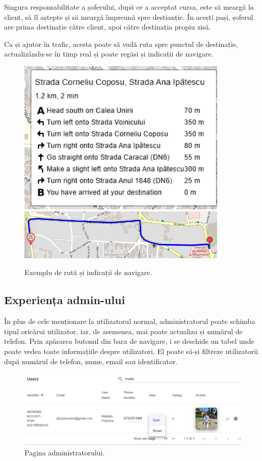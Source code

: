 Singura responsabilitate a șoferului, după ce a acceptat cursa, este să meargă la client, să îl aștepte și să
meargă împreună spre destianție. În acești pași, șoferul are prima destinație către client, apoi către destinația propiu zisă.

Ca și ajutor în trafic, acesta poate să vadă ruta spre punctul de destinație, actualizându-se în timp real și poate regăsi și
indicații de navigare.

\begin{figure}[H]
    \centering
    \includegraphics[width=10cm]{Assets/indicates.png}
    \includegraphics[width=10cm]{Assets/route.png}
    \caption{Exemplu de rută și indicații de navigare.}
    \label{fig:indicates}
\end{figure}

\subsection{Experiența admin-ului}

În plus de cele menționare la utilizatorul normal, administratorul poate schimba tipul 
oricărui utilizator, iar, de asemenea, mai poate actualiza și numărul de telefon.
Prin apăsarea butonul din bara de navigare, i se deschide un tabel unde poate vedea toate informațiile despre utilizatori.
El poate să-și filtreze utilizatorii după numărul de telefon, nume, email sau identificator.
\begin{figure}[H]
    \centering
    \includegraphics[width=16cm]{Assets/adminPage.png}
    \caption{Pagina administratorului.}
    \label{fig:adminPage}
\end{figure}

